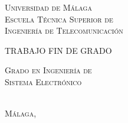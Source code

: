 
\thispagestyle{empty}


	\begin{center}
		\Large \scshape
		Universidad de Málaga\\
		\bigskip
		Escuela Técnica Superior de\\
		Ingeniería de Telecomunicación
	\end{center}

	\bigskip


\bigskip

	\bigskip \bigskip \bigskip \bigskip

	\begin{center}
		\Large \scshape
		TRABAJO FIN DE GRADO
	\end{center}

	\bigskip \bigskip \bigskip \bigskip

	\begin{center}
		\huge \scshape
		\tfgtitlename %
	\end{center}

	\vfill

	\begin{center}
		\Large \scshape
		Grado en Ingeniería de\\
		Sistema Electrónico 
	\end{center}

	\bigskip \bigskip \bigskip \bigskip


	\begin{flushright}
		\large \scshape
		\tfgauthorname \\%
		Málaga, \tfganno %
	\end{flushright}



\blankpage
